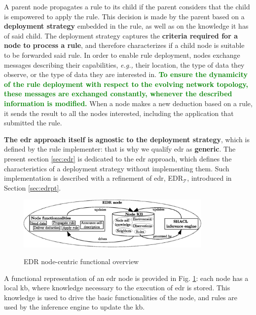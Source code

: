 \documentclass{iosart2c}
\newcommand{\edrt}{EDR$_{\mathcal{T}}$\xspace}
\newcommand{\added}[1]{\textcolor{green}{\textbf{#1}}}
\begin{document}
A parent node propagates a rule to its child if the parent considers that the child is empowered to apply the rule.
This decision is made by the parent based on a \textbf{deployment strategy} embedded in the rule, as well as on the knowledge it has of said child.
The deployment strategy captures the \textbf{criteria required for a node to process a rule}, and therefore characterizes if a child node is suitable to be forwarded said rule.
In order to enable rule deployment, nodes exchange messages describing their capabilities, \textit{e.g.,} their location, the type of data they observe, or the type of data they are interested in.
\added{To ensure the \textbf{dynamicity} of the rule deployment with respect to the \textbf{evolving network topology}, these messages are exchanged constantly, whenever the described information is modified.}
When a node makes a new deduction based on a rule, it sends the result to all the nodes interested, including the application that submitted the rule.

\textbf{The \gls{edr} approach itself is agnostic to the deployment strategy}, which is defined by the rule implementer: that is why we qualify \gls{edr} as \textbf{generic}. 
The present section \textsection \ref{sec:edr} is dedicated to the \gls{edr} approach, which defines the characteristics of a deployment strategy without implementing them.
Such implementation is described with a refinement of \gls{edr}, \edrt, introduced in Section \textsection \ref{sec:edrpt}.

\begin{figure}
	\centering
	\caption{EDR node-centric functional overview}
	\includegraphics[width=0.85\textwidth]{figures/overview.eps}
	\label{fig:node_overview}
\end{figure}

A functional representation of an \gls{edr} node is provided in Fig. \ref{fig:node_overview}: each node has a local \gls{kb}, where knowledge necessary to the execution of \gls{edr} is stored.
This knowledge is used to drive the basic functionalities of the node, and rules are used by the inference engine to update the \gls{kb}.
\end{document}
